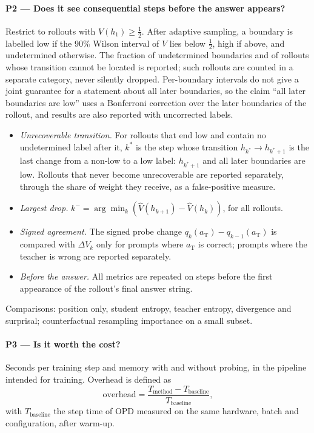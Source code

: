 \documentclass[11pt]{article}
\theoremstyle{definition}
\theoremstyle{remark}
\newcommand{\aT}{a_{\mathrm{T}}}
\begin{document}
\paragraph{P2 --- Does it see consequential steps before the answer appears?}
Restrict to rollouts with $V(h_1)\ge\tfrac12$. After adaptive sampling, a boundary is labelled low if the 90\% Wilson interval of $V$ lies below $\tfrac12$, high if above, and undetermined otherwise. The fraction of undetermined boundaries and of rollouts whose transition cannot be located is reported; such rollouts are counted in a separate category, never silently dropped. Per-boundary intervals do not give a joint guarantee for a statement about all later boundaries, so the claim ``all later boundaries are low'' uses a Bonferroni correction over the later boundaries of the rollout, and results are also reported with uncorrected labels.
\begin{itemize}[itemsep=1pt]
\item \emph{Unrecoverable transition.} For rollouts that end low and contain no undetermined label after it, $k^\ast$ is the step whose transition $h_{k^\ast}\to h_{k^\ast+1}$ is the last change from a non-low to a low label: $h_{k^\ast+1}$ and all later boundaries are low. Rollouts that never become unrecoverable are reported separately, through the share of weight they receive, as a false-positive measure.
\item \emph{Largest drop.} $k^-=\arg\min_k(\hat V(h_{k+1})-\hat V(h_k))$, for all rollouts.
\item \emph{Signed agreement.} The signed probe change $q_k(\aT)-q_{k-1}(\aT)$ is compared with $\Delta V_k$ only for prompts where $\aT$ is correct; prompts where the teacher is wrong are reported separately.
\item \emph{Before the answer.} All metrics are repeated on steps before the first appearance of the rollout's final answer string.
\end{itemize}
Comparisons: position only, student entropy, teacher entropy, divergence and surprisal; counterfactual resampling importance \citep{bogdan2025thought} on a small subset.

\paragraph{P3 --- Is it worth the cost?}
Seconds per training step and memory with and without probing, in the pipeline intended for training. Overhead is defined as
\[
\text{overhead}=\frac{T_{\text{method}}-T_{\text{baseline}}}{T_{\text{baseline}}},
\]
with $T_{\text{baseline}}$ the step time of OPD measured on the same hardware, batch and configuration, after warm-up.
\end{document}

